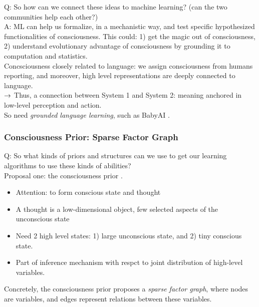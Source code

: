 Q: So how can we connect these ideas to machine learning? (can the two communities help each other?) \\

A: ML can help us formalize, in a mechanistic way, and test specific hypothesized functionalities of consciousness. This could: 1) get the magic out of consciousness, 2) understand evolutionary advantage of consciousness by grounding it to computation and statistics. \\

Concsciousness closely related to language: we assign consciousness from humans reporting, and moreover, high level representations are deeply connected to language. \\

$\rightarrow$ Thus, a connection between System 1 and System 2: meaning anchored in low-level perception and action. \\

So need {\it grounded language learning}, such as BabyAI \cite{chevalier2018babyai}.

\spacerule
\subsubsection{Consciousness Prior: Sparse Factor Graph}

Q: So what kinds of priors and structures can we use to get our learning algorithms to use these kinds of abilities? \\

Proposal one: the consciousness prior \cite{bengio2017consciousness}.
\begin{itemize}
    \item Attention: to form conscious state and thought
    \item A thought is a low-dimensional object, few selected aspects of the unconscious state
    \item Need 2 high level states: 1) large unconscious state, and 2) tiny conscious state.
    \item Part of inference mechanism with respct to joint distribution of high-level variables.
\end{itemize}

Concretely, the consciousness prior proposes a {\it sparse factor graph}, where nodes are variables, and edges represent relations between these variables.\\

